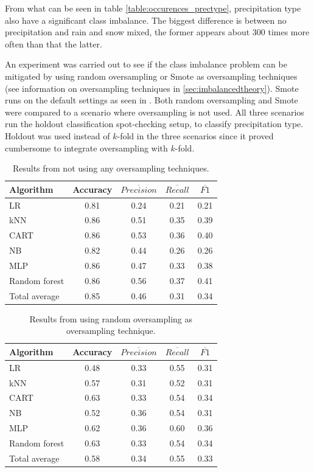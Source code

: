 	From what can be seen in table \ref{table:occurences_prectype}, precipitation type also have a significant class imbalance. The biggest difference is between no precipitation and rain and snow mixed, the former appears about 300 times more often than that the latter.

	An experiment was carried out to see if the class imbalance problem can be mitigated by using random oversampling or Smote as oversampling techniques (see information on oversampling techniques in \ref{sec:imbalancedtheory}). Smote runs on the default settings as seen in \cite{WEBSITE:23}. Both random oversampling and Smote were compared to a scenario where oversampling is not used. All three scenarios run the holdout classification spot-checking setup, to classify precipitation type. Holdout was used instead of $k$-fold in the three scenarios since it proved cumbersome to integrate oversampling with $k$-fold.

	\begin{table}[H]
	\centering
	\caption{Results from not using any oversampling techniques. }
		\begin{tabular}[5]{l | c | c | c | c}
    			Algorithm & Accuracy & $\overline{Precision}$ & $\overline{Recall}$ & $\overline{F1}$ \\
    			\hline
			LR & 0.81 & 0.24 & 0.21 & 0.21  \\
			kNN & 0.86 & 0.51 & 0.35 & 0.39  \\
			CART & 0.86 & 0.53 & 0.36 & 0.40 \\
			NB & 0.82 & 0.44 & 0.26 & 0.26  \\
			MLP & 0.86 & 0.47 & 0.33 &  0.38  \\
			Random forest & 0.86 & 0.56 & 0.37 & 0.41  \\
			\hline
			Total average & 0.85 & 0.46 & 0.31 & 0.34
			\label{table:no_oversampling}
		\end{tabular}
	\end{table}

	\begin{table}[H]
	\centering
	\caption{Results from using random oversampling as oversampling technique.}
		\begin{tabular}[5]{l | c | c | c | c}
    			Algorithm & Accuracy & $\overline{Precision}$ & $\overline{Recall}$ & $\overline{F1}$ \\
    			\hline
			LR & 0.48 & 0.33 & 0.55 & 0.31 \\
			kNN & 0.57 &  0.31 & 0.52 &  0.31 \\
			CART & 0.63 & 0.33 & 0.54 &  0.34 \\
			NB &  0.52 & 0.36 & 0.54 & 0.31 \\
			MLP & 0.62 & 0.36 & 0.60 & 0.36 \\
			Random forest & 0.63 & 0.33 & 0.54 &  0.34 \\
			\hline
			Total average & 0.58 & 0.34 & 0.55 & 0.33 
			\label{table:random_oversampling}
		\end{tabular}
	\end{table}

